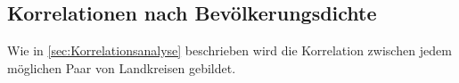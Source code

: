 \subsection{Korrelationen nach Bevölkerungsdichte}
Wie in \autoref{sec:Korrelationsanalyse} beschrieben wird die Korrelation zwischen jedem möglichen Paar von Landkreisen gebildet. 

